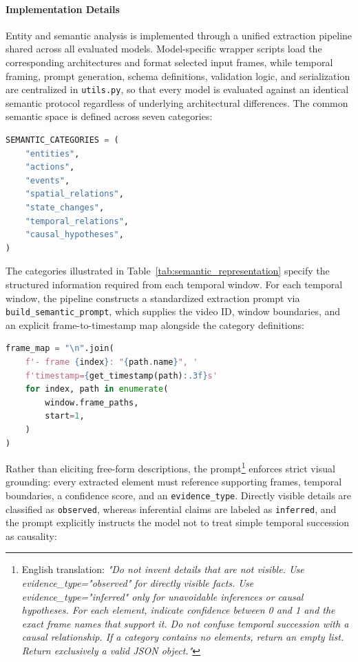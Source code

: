 \paragraph{Implementation Details}
Entity and semantic analysis is implemented through a unified extraction pipeline shared across all evaluated models. Model-specific wrapper scripts load the corresponding architectures and format selected input frames, while temporal framing, prompt generation, schema definitions, validation logic, and serialization are centralized in \texttt{utils.py}, so that every model is evaluated against an identical semantic protocol regardless of underlying architectural differences.
The common semantic space is defined across seven categories:
\begin{lstlisting}[language=Python]
SEMANTIC_CATEGORIES = (
    "entities",
    "actions",
    "events",
    "spatial_relations",
    "state_changes",
    "temporal_relations",
    "causal_hypotheses",
)
\end{lstlisting}
The categories illustrated in Table~\ref{tab:semantic_representation} specify the structured information required from each temporal window.
For each temporal window, the pipeline constructs a standardized extraction prompt via \texttt{build\_semantic\_prompt}, which supplies the video ID, window boundaries, and an explicit frame-to-timestamp map alongside the category definitions:
\begin{lstlisting}[language=Python]
frame_map = "\n".join(
    f'- frame {index}: "{path.name}", '
    f'timestamp={get_timestamp(path):.3f}s'
    for index, path in enumerate(
        window.frame_paths,
        start=1,
    )
)
\end{lstlisting}
Rather than eliciting free-form descriptions, the prompt\footnote{English translation: \textit{"Do not invent details that are not visible. Use evidence\_type="observed" for directly visible facts. Use evidence\_type="inferred" only for unavoidable inferences or causal hypotheses. For each element, indicate confidence between 0 and 1 and the exact frame names that support it. Do not confuse temporal succession with a causal relationship. If a category contains no elements, return an empty list. Return exclusively a valid JSON object."}} enforces strict visual grounding: every extracted element must reference supporting frames, temporal boundaries, a confidence score, and an \texttt{evidence\_type}. Directly visible details are classified as \texttt{observed}, whereas inferential claims are labeled as \texttt{inferred}, and the prompt explicitly instructs the model not to treat simple temporal succession as causality:

